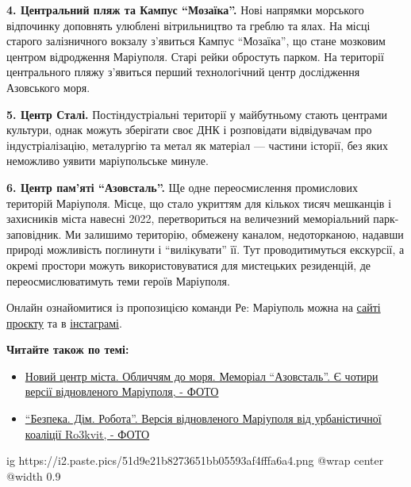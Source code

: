 
\textbf{4. Центральний пляж та Кампус \enquote{Мозаїка}.} Нові напрямки морського відпочинку
доповнять улюблені вітрильництво та греблю та ялах. На місці старого
залізничного вокзалу з'явиться Кампус \enquote{Мозаїка}, що стане мозковим центром
відродження Маріуполя. Старі рейки обростуть парком. На території центрального
пляжу з'явиться перший технологічний центр дослідження Азовського моря.


\textbf{5. Центр Сталі.} Постіндустріальні території у майбутньому стають
центрами культури, однак можуть зберігати своє ДНК і розповідати відвідувачам
про індустріалізацію, металургію та метал як матеріал — частини історії, без
яких неможливо уявити маріупольське минуле.


\textbf{6. Центр пам'яті \enquote{Азовсталь}.} Ще одне переосмислення промислових
територій Маріуполя. Місце, що стало укриттям для кількох тисяч мешканців і
захисників міста навесні 2022, перетвориться на величезний меморіальний
парк-заповідник.  Ми залишимо територію, обмежену каналом, недоторканою,
надавши природі можливість поглинути і \enquote{вилікувати} її. Тут
проводитимуться екскурсії, а окремі простори можуть використовуватися для
мистецьких резиденцій, де переосмислюватимуть теми героїв Маріуполя.


Онлайн ознайомитися із пропозицією команди Ре: Маріуполь можна на \href{https://re-mariupol.com}{сайті проєкту} 
та в \href{https://www.instagram.com/re_mariupol}{інстаграмі}.

\textbf{Читайте також по темі:}

\begin{itemize} %
  \item \href{https://www.0629.com.ua/news/3620811/novij-centr-mista-obliccam-do-mora-memorial-azovstal-e-cotiri-versii-vidnovlenogo-mariupola-foto}{Новий центр міста. Обличчям до моря. Меморіал \enquote{Азовсталь}. Є чотири версії відновленого Маріуполя, - ФОТО}

  \item \href{https://www.0629.com.ua/news/3622392/bezpeka-dim-robota-versia-vidnovlenogo-mariupola-vid-urbanisticnoi-koalicii-ro3kvit-foto}{\enquote{Безпека. Дім. Робота}. Версія відновленого Маріуполя від урбаністичної коаліції Ro3kvit, - ФОТО}
\end{itemize} %

\ifcmt
  ig https://i2.paste.pics/51d9e21b8273651bb05593af4fffa6a4.png
  @wrap center
  @width 0.9
\fi
